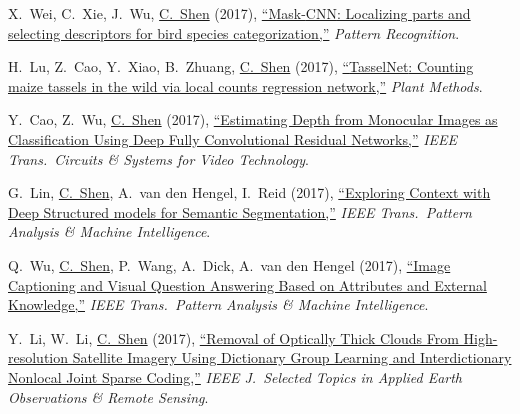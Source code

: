 \documentclass[9pt, a4paper]{article}
\newcommand{\years}[1]{\marginnote{\scriptsize #1}}
\def\highlight{\uline}
\begin{document}
\years{2017} X.~Wei, C.~Xie, J.~Wu, \highlight{C.~Shen} (2017),
\href{http://www.google.com/search?lr=&ie=UTF-8&oe=UTF-8&q=Mask-CNN%3A+Localizing+parts+and+selecting+descriptors+for+bird+species+categorization+Xiu-Shen+Wei%2C+Chen-Wei+Xie%2C+Jianxin+Wu%2C+Chunhua+Shen}{``Mask-{CNN}: Localizing parts and selecting descriptors for bird species categorization,{}''}
\emph{Pattern Recognition}.

\medskip

\years{2017} H.~Lu, Z.~Cao, Y.~Xiao, B.~Zhuang, \highlight{C.~Shen} (2017),
\href{http://www.google.com/search?lr=&ie=UTF-8&oe=UTF-8&q=TasselNet%3A+Counting+maize+tassels+in+the+wild+via+local+counts+regression+network+Hao+Lu%2C+Zhiguo+Cao%2C+Yang+Xiao%2C+Bohan+Zhuang%2C+Chunhua+Shen}{``{TasselNet}: Counting maize tassels in the wild via local counts regression network,{}''}
\emph{Plant Methods}.

\medskip

\years{2017} Y.~Cao, Z.~Wu, \highlight{C.~Shen} (2017),
\href{http://www.google.com/search?lr=&ie=UTF-8&oe=UTF-8&q=Estimating+Depth+from+Monocular+Images+as+Classification+Using+Deep+Fully+Convolutional+Residual+Networks+Yuanzhouhan+Cao%2C+Zifeng+Wu%2C+Chunhua+Shen}{``Estimating Depth from Monocular Images as Classification Using Deep Fully Convolutional Residual Networks,{}''}
\emph{IEEE Trans.\  Circuits \& Systems for Video Technology}.

\medskip

\years{2017} G.~Lin, \highlight{C.~Shen}, A.~van den Hengel, I.~Reid (2017),
\href{http://www.google.com/search?lr=&ie=UTF-8&oe=UTF-8&q=Exploring+Context+with+Deep+Structured+models+for+Semantic+Segmentation+Guosheng+Lin%2C+Chunhua+Shen%2C+Anton+van+den+Hengel%2C+Ian+Reid}{``Exploring Context with Deep Structured models for Semantic Segmentation,{}''}
\emph{IEEE Trans.\  Pattern Analysis \& Machine Intelligence}.

\medskip

\years{2017} Q.~Wu, \highlight{C.~Shen}, P.~Wang, A.~Dick, A.~van den Hengel (2017),
\href{http://www.google.com/search?lr=&ie=UTF-8&oe=UTF-8&q=Image+Captioning+and+Visual+Question+Answering+Based+on+Attributes+and+External+Knowledge+Qi+Wu%2C+Chunhua+Shen%2C+Peng+Wang%2C+Anthony+Dick%2C+Anton+van+den+Hengel}{``Image Captioning and Visual Question Answering Based on Attributes and External Knowledge,{}''}
\emph{IEEE Trans.\  Pattern Analysis \& Machine Intelligence}.

\medskip

\years{2017} Y.~Li, W.~Li, \highlight{C.~Shen} (2017),
\href{http://www.google.com/search?lr=&ie=UTF-8&oe=UTF-8&q=Removal+of+Optically+Thick+Clouds+From+High-resolution+Satellite+Imagery+Using+Dictionary+Group+Learning+and+Interdictionary+Nonlocal+Joint+Sparse+Coding+Ying+Li%2C+Wenbo+Li%2C+Chunhua+Shen}{``Removal of Optically Thick Clouds From High-resolution Satellite Imagery Using Dictionary Group Learning and Interdictionary Nonlocal Joint Sparse Coding,{}''}
\emph{IEEE J.\  Selected Topics in Applied Earth Observations \& Remote Sensing}.
\end{document}
